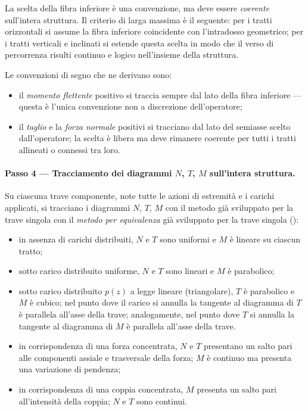 La scelta della fibra inferiore è una convenzione,
ma deve essere \emph{coerente} sull'intera struttura.
Il criterio di larga massima è il seguente: per i
tratti orizzontali si assume la fibra inferiore
coincidente con l'intradosso geometrico; per i
tratti verticali e inclinati si estende questa
scelta in modo che il verso di percorrenza risulti
continuo e logico nell'insieme della struttura.

Le convenzioni di segno che ne derivano sono:
\begin{itemize}
	\item il \emph{momento flettente} positivo
	si traccia sempre dal lato della fibra
	inferiore --- questa è l'unica convenzione
	non a discrezione dell'operatore;
	\item il \emph{taglio} e la \emph{forza
		normale} positivi si tracciano dal lato
	del semiasse scelto dall'operatore; la
	scelta è libera ma deve rimanere coerente
	per tutti i tratti allineati o connessi
	tra loro.
\end{itemize}

\paragraph{Passo 4 --- Tracciamento dei diagrammi
	$N$, $T$, $M$ sull'intera struttura.}

Su ciascuna trave componente, note tutte le azioni di estremità e i carichi applicati, si tracciano 
i diagrammi $N$, $T$, $M$ con il metodo già sviluppato per la trave singola con il \emph{metodo per equivalenza} 
già sviluppato per la trave singola ():

\begin{itemize}
	\item in assenza di carichi distribuiti,
	$N$ e $T$ sono uniformi e $M$ è lineare
	su ciascun tratto;
	
	\item sotto carico distribuito uniforme,
	$N$ e $T$ sono lineari e $M$ è parabolico;
	
	\item sotto carico distribuito $p(z)$ a legge lineare
	(triangolare), $T$ è parabolico e $M$ è cubico;
	nel punto dove il carico si annulla la tangente
	al diagramma di $T$ è parallela all'asse della
	trave; analogamente, nel punto dove $T$ si annulla
	la tangente al diagramma di $M$ è parallela
	all'asse della trave.
	
	\item in corrispondenza di una forza
	concentrata, $N$ e $T$ presentano un salto pari
	alle componenti assiale e trasversale della forza;
	$M$ è continuo ma presenta una variazione di pendenza;
	
	\item in corrispondenza di una coppia
	concentrata, $M$ presenta un salto pari
	all'intensità della coppia; $N$ e $T$
	sono continui.
\end{itemize}

